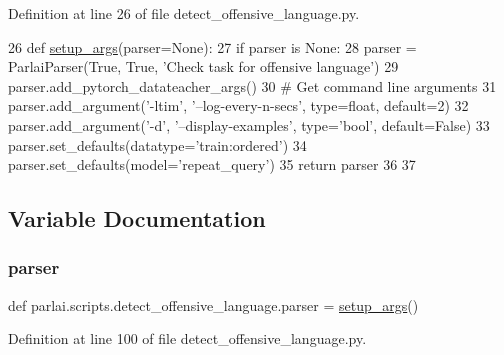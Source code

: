 Definition at line 26 of file detect\+\_\+offensive\+\_\+language.\+py.


\begin{DoxyCode}
26 \textcolor{keyword}{def }\hyperlink{namespaceparlai_1_1scripts_1_1detect__offensive__language_ab3f20447fd2442afdcd45dd77b619378}{setup\_args}(parser=None):
27     \textcolor{keywordflow}{if} parser \textcolor{keywordflow}{is} \textcolor{keywordtype}{None}:
28         parser = ParlaiParser(\textcolor{keyword}{True}, \textcolor{keyword}{True}, \textcolor{stringliteral}{'Check task for offensive language'})
29     parser.add\_pytorch\_datateacher\_args()
30     \textcolor{comment}{# Get command line arguments}
31     parser.add\_argument(\textcolor{stringliteral}{'-ltim'}, \textcolor{stringliteral}{'--log-every-n-secs'}, type=float, default=2)
32     parser.add\_argument(\textcolor{stringliteral}{'-d'}, \textcolor{stringliteral}{'--display-examples'}, type=\textcolor{stringliteral}{'bool'}, default=\textcolor{keyword}{False})
33     parser.set\_defaults(datatype=\textcolor{stringliteral}{'train:ordered'})
34     parser.set\_defaults(model=\textcolor{stringliteral}{'repeat\_query'})
35     \textcolor{keywordflow}{return} parser
36 
37 
\end{DoxyCode}


\subsection{Variable Documentation}
\mbox{\label{namespaceparlai_1_1scripts_1_1detect__offensive__language_a87baca22cf582a78790990b713c5b8ea}} 
\subsubsection{\texorpdfstring{parser}{parser}}
{\footnotesize\ttfamily def parlai.\+scripts.\+detect\+\_\+offensive\+\_\+language.\+parser = \hyperlink{namespaceparlai_1_1scripts_1_1detect__offensive__language_ab3f20447fd2442afdcd45dd77b619378}{setup\+\_\+args}()}



Definition at line 100 of file detect\+\_\+offensive\+\_\+language.\+py.

